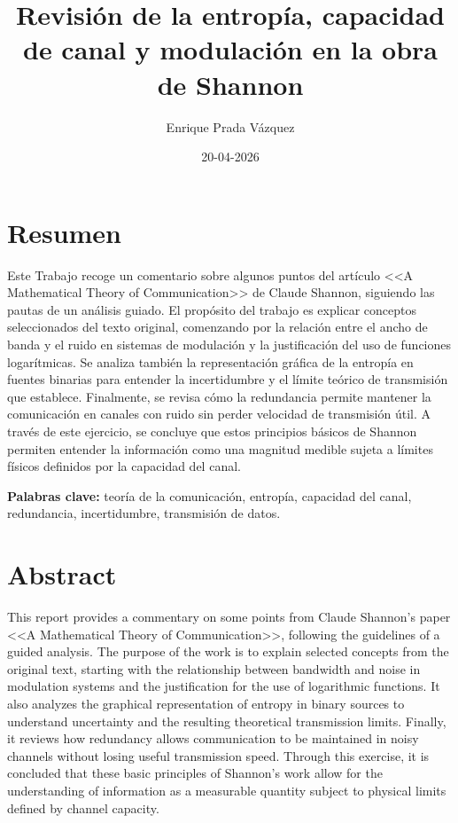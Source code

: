 \documentclass[11pt,a4paper,spanish]{book}
\title{Revisión de la entropía, capacidad de canal y modulación en la obra de Shannon}
\author{Enrique Prada Vázquez}
\date{20-04-2026}
\begin{document}
\renewcommand{\listfigurename}{Índice de figuras}
\renewcommand{\listtablename}{Índice de tablas}
\renewcommand{\contentsname}{Índice de contenidos}
\renewcommand{\figurename}{Figura}
\renewcommand{\tablename}{Tabla} 

\maketitle
\frontmatter
\tableofcontents

\chapter{Resumen}
Este Trabajo recoge un comentario sobre algunos puntos del artículo <<A Mathematical Theory of Communication>> de Claude Shannon, siguiendo las pautas de un análisis guiado. El propósito del trabajo es explicar conceptos seleccionados del texto original, comenzando por la relación entre el ancho de banda y el ruido en sistemas de modulación y la justificación del uso de funciones logarítmicas. Se analiza también la representación gráfica de la entropía en fuentes binarias para entender la incertidumbre y el límite teórico de transmisión que establece. Finalmente, se revisa cómo la redundancia permite mantener la comunicación en canales con ruido sin perder velocidad de transmisión útil. A través de este ejercicio, se concluye que estos principios básicos de Shannon permiten entender la información como una magnitud medible sujeta a límites físicos definidos por la capacidad del canal.

\vspace{0.5cm}
{\bf Palabras clave:} teoría de la comunicación, entropía, capacidad del canal, redundancia, incertidumbre, transmisión de datos.

\chapter{Abstract}
This report provides a commentary on some points from Claude Shannon's paper <<A Mathematical Theory of Communication>>, following the guidelines of a guided analysis. The purpose of the work is to explain selected concepts from the original text, starting with the relationship between bandwidth and noise in modulation systems and the justification for the use of logarithmic functions. It also analyzes the graphical representation of entropy in binary sources to understand uncertainty and the resulting theoretical transmission limits. Finally, it reviews how redundancy allows communication to be maintained in noisy channels without losing useful transmission speed. Through this exercise, it is concluded that these basic principles of Shannon's work allow for the understanding of information as a measurable quantity subject to physical limits defined by channel capacity.
\end{document}
